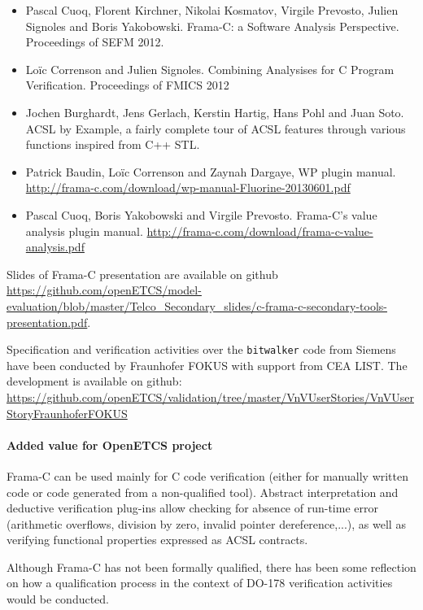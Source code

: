 \begin{itemize}
\item Pascal Cuoq, Florent Kirchner, Nikolai Kosmatov, Virgile Prevosto,
  Julien Signoles and Boris Yakobowski. Frama-C: a Software Analysis
  Perspective. Proceedings of SEFM 2012.
\item Loïc Correnson and Julien Signoles. Combining Analysises for
  C Program Verification. Proceedings of FMICS 2012
\item Jochen Burghardt, Jens Gerlach, Kerstin Hartig, Hans Pohl and Juan Soto.
  ACSL by Example, a fairly complete tour of ACSL features through
  various functions inspired from C++ STL.
\item Patrick Baudin, Loïc Correnson and Zaynah Dargaye, WP plugin manual.
\url{http://frama-c.com/download/wp-manual-Fluorine-20130601.pdf}
\item Pascal Cuoq, Boris Yakobowski and Virgile Prevosto.
  Frama-C's value analysis plugin manual. 
  \url{http://frama-c.com/download/frama-c-value-analysis.pdf}
\end{itemize}

Slides of Frama-C presentation are available on github
\url{https://github.com/openETCS/model-evaluation/blob/master/Telco_Secondary_slides/c-frama-c-secondary-tools-presentation.pdf}.

Specification and verification activities over the \texttt{bitwalker} code from
Siemens have been conducted by Fraunhofer FOKUS with support from CEA LIST.
The development is available on github: \url{https://github.com/openETCS/validation/tree/master/VnVUserStories/VnVUserStoryFraunhoferFOKUS}

\paragraph{Added value for OpenETCS project}

Frama-C can be used mainly for C code verification (either for manually written
code or code generated from a non-qualified tool). Abstract interpretation
and deductive verification plug-ins allow checking for absence of run-time
error (arithmetic overflows, division by zero, invalid pointer
dereference,...), as well as verifying functional properties expressed as
ACSL contracts.

Although Frama-C has not been formally qualified, there has been some reflection
on how a qualification process in the context of DO-178 verification activities
would be conducted.

